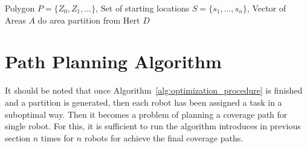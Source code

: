 \documentclass[../main.tex]{subfiles}
\begin{document}
\begin{algorithm}
	\caption{$\operatorname{anchored\_area\_partition}(P, S, A)$}
	\label{alg:anchored_area_partition}
	\begin{algorithmic}[1]
		\REQUIRE Polygon $P=\{Z_0,Z_1,\ldots\}$, Set of starting locations $S=\{s_1,\ldots,s_n\}$, Vector of Areas $A$
		\STATE do area partition from Hert
		\RETURN $D$
	\end{algorithmic}
\end{algorithm}

%


\section{Path Planning Algorithm}
It should be noted that once Algorithm~\ref{alg:optimization_procedure} is finished and a partition is generated, then each robot has been assigned a task in a suboptimal way. Then it becomes a problem of planning a coverage path for single robot. For this, it is sufficient to run the algorithm introduces in previous section $n$ times for $n$ robots for achieve the final coverage paths.
\end{document}
